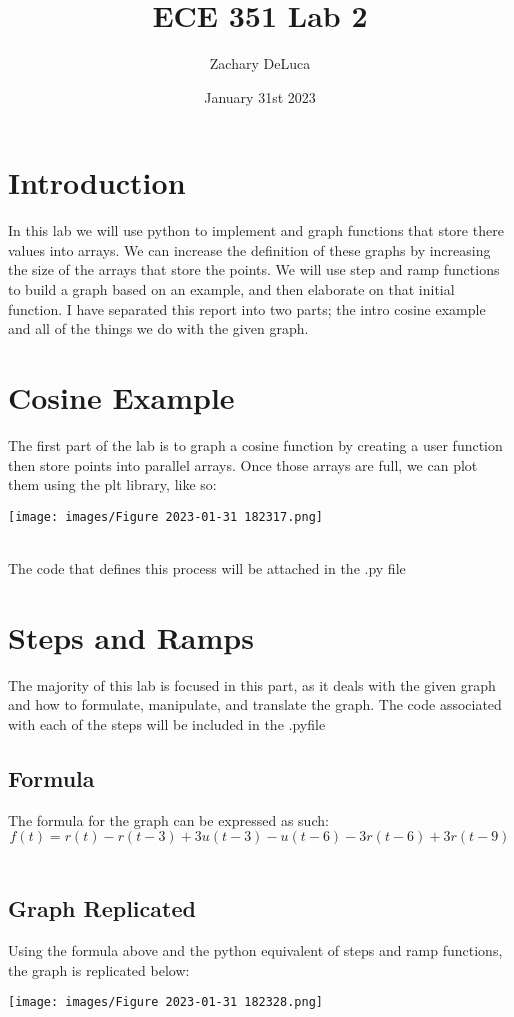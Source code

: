 \documentclass[12pt,a4paper]{article}
\title{ECE 351 Lab 2}
\author{Zachary DeLuca  }
\date{January 31st 2023}
\begin{document}
\maketitle

\section{Introduction}
    In this lab we will use python to implement and graph functions that store there values into arrays. We can increase the definition of these graphs by increasing the size of the arrays that store the points. We will use step and ramp functions to build a graph based on an example, and then elaborate on that initial function. I have separated this report into two parts; the intro cosine example and all of the things we do with the given graph.
\section{Cosine Example}
The first part of the lab is to graph a cosine function by creating a user function then store points into parallel arrays. Once those arrays are full, we can plot them using the plt library, like so: \\
\begin{center}
\texttt{[image: images/Figure 2023-01-31 182317.png]}
\end{center}
\\ 
The code that defines this process will be attached in the .py file 

\section{Steps and Ramps}
The majority of this lab is focused in this part, as it deals with the given graph and how to formulate, manipulate, and translate the graph. The code associated with each of the steps will be included in the .pyfile 
\subsection{Formula}
The formula for the graph can be expressed as such: \\
$$f(t)=r(t)-r(t-3)+3u(t-3)-u(t-6)-3r(t-6)+3r(t-9)$$ \\
\subsection{Graph Replicated}
Using the formula above and the python equivalent of steps and ramp functions, the graph is replicated below: \\
\begin{center}
\texttt{[image: images/Figure 2023-01-31 182328.png]}
\end{center}
\end{document}

